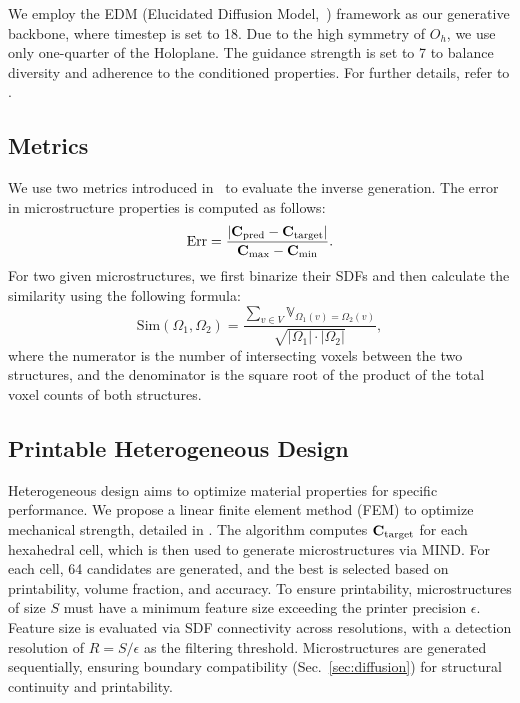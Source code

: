 We employ the EDM (Elucidated Diffusion Model,~\cite{karras2022edm}) framework as our generative backbone, where timestep is set to 18.
Due to the high symmetry of $O_h$, we use only one-quarter of the Holoplane.
The guidance strength is set to 7 to balance diversity and adherence to the conditioned properties.
For further details, refer to \sreftraining.

\subsection{Metrics}
\label{sec:metrics}
We use two metrics introduced in~\cite{Yang2024} to evaluate the inverse generation.
The error in microstructure properties is computed as follows:
\begin{equation}
\label{eq:error}
    \text{Err} = \frac{\left|\mathbf{C}_{\text{pred}} - \mathbf{C}_{\text{target}}\right|}{\mathbf{C}_{\text{max}} - \mathbf{C}_{\text{min}}}.
\end{equation}
For two given microstructures, we first binarize their SDFs and then calculate the similarity using the following formula:
\begin{equation}
\label{eq:sim}
    \text{Sim}(\Omega_1, \Omega_2) = \frac{\sum_{v \in V} \mathbb{V}_{\Omega_1(v) = \Omega_2(v)}}{\sqrt{|\Omega_1| \cdot |\Omega_2|}},
\end{equation}
where the numerator is the number of intersecting voxels between the two structures, and the denominator is the square root of the product of the total voxel counts of both structures.

\subsection{Printable Heterogeneous Design}
Heterogeneous design aims to optimize material properties for specific performance. 
We propose a linear finite element method (FEM) to optimize mechanical strength, detailed in \srefHeterdesign.
The algorithm computes $\mathbf{C}_{\text{target}}$ for each hexahedral cell, which is then used to generate microstructures via MIND. 
For each cell, 64 candidates are generated, and the best is selected based on printability, volume fraction, and accuracy.
To ensure printability, microstructures of size $S$ must have a minimum feature size exceeding the printer precision $\epsilon$. 
Feature size is evaluated via SDF connectivity across resolutions, with a detection resolution of $R = S / \epsilon$ as the filtering threshold.
Microstructures are generated sequentially, ensuring boundary compatibility (Sec.~\ref{sec:diffusion}) for structural continuity and printability.
